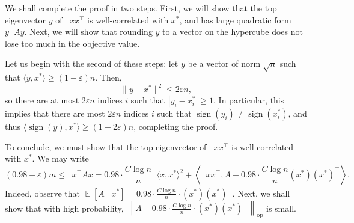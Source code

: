 \documentclass[11pt]{article}
\theoremstyle{definition}
\renewcommand{\epsilon}{\varepsilon}
\newcommand{\eps}{\epsilon}
\DeclareMathOperator{\E}{\mathbb{E}} %
\DeclareMathOperator{\pE}{\widetilde{\mathbb{E}}} %
\newcommand{\opnorm}[1]{\left\|#1\right\|_{\mathrm{op}}}
\newcommand{\sgn}{\operatorname{sign}}
\begin{document}
\begin{enumerate}[label=(\alph*)]
    We shall complete the proof in two steps. First, we will show that the top eigenvector $y$ of $\pE xx^\top$ is well-correlated with $x^*$, and has large quadratic form $y^\top A y$. Next, we will show that rounding $y$ to a vector on the hypercube does not lose too much in the objective value.

    Let us begin with the second of these steps: let $y$ be a vector of norm $\sqrt{n}$ such that $\langle y,x^*\rangle \ge (1-\eps) n$. Then,
    \[ \|y-x^*\|^2 \le 2\eps n, \]
    so there are at most $2\eps n$ indices $i$ such that $|y_i - x_i^*| \ge 1$. In particular, this implies that there are most $2\eps n$ indices $i$ such that $\sgn(y_i) \ne \sgn(x_i^*)$, and thus $\langle \sgn(y) , x^* \rangle \ge (1-2\eps)n$, completing the proof.

    To conclude, we must show that the top eigenvector of $\pE xx^\top$ is well-correlated with $x^*$. We may write
    \begin{equation}
      \label{eq:q3-high-corr}
      (0.98-\eps) m \le \pE x^\top A x = 0.98 \cdot \frac{C \log n}{n} \pE \langle x , x^* \rangle^2 + \left\langle \pE xx^\top , A - 0.98 \cdot \frac{C\log n}{n} (x^*)(x^*)^\top \right\rangle.
    \end{equation}
    Indeed, observe that $\E[A \mid x^*] = 0.98 \cdot \frac{C \log n}{n} \cdot (x^*)(x^*)^\top$.
    Next, we shall show that with high probability, $\opnorm{ A - 0.98 \cdot \frac{C \log n}{n} \cdot (x^*)(x^*)^\top }$ is small.


\end{enumerate}
\end{document}
